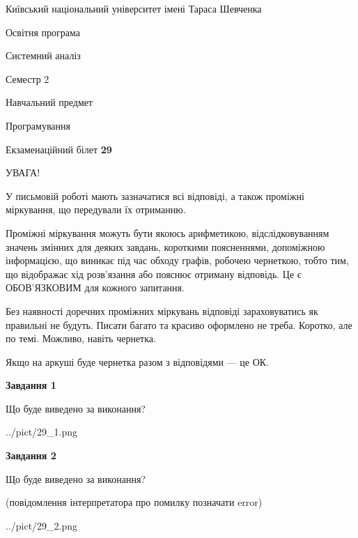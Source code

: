 \documentclass[12pt, ukrainian]{article}
\begin{document}
{{\begin {small}\par
{ \center  Київський національний університет імені Тараса Шевченка \par}
{\parbox {5 cm}{Освітня програма \hfill}{\parbox {7 cm}{Системний аналіз \hfill}}\parbox {6 cm}{\hfill Семестр 2}}\par
{\parbox {5 cm} {Навчальний предмет \hfill}\parbox {7 cm}{Програмування \hfill}\parbox {6cm}{\hfill}\par}\vspace{-7pt} \end{small}}{\center Екзаменаційний білет \No \textbf
{ 29 }\par}}
{
\begin {large}
УВАГА!

У письмовій роботі мають зазначатися всі відповіді, а також проміжні міркування, що передували їх отриманню.

Проміжні міркування можуть бути якоюсь арифметикою, відслідковуванням зна\-чень змінних для деяких завдань,
короткими поясненнями, допоміжною інформацією, що виникає під час обходу графів, робочею чернеткою,
тобто тим, що відображає хід розв’язання або пояснює отриману відповідь.
Це є ОБОВ’ЯЗКОВИМ для кожного запитання.

Без наявності доречних проміжних міркувань відповіді зараховуватись як правиль\-ні не будуть.
Писати багато та красиво оформлено не треба. Коротко, але по темі. Можли\-во, навіть чернетка.

Якщо на аркуші буде чернетка разом з відповідями --- це ОК.

\newpage

{\begin {center}\textbf{Завдання 1}\end {center}}\par
Що буде виведено за виконання?\par
\begin{center}
	{../pict/29_1.png}
\end{center}
\newpage

{\begin {center}\textbf{Завдання 2}\end {center}}\par
Що буде виведено за виконання?\par
 (повідомлення інтерпретатора про помилку позначати error)\par
\begin{center}
	{../pict/29_2.png}
\end{center}
\newpage


\end{large}}
\end{document}
